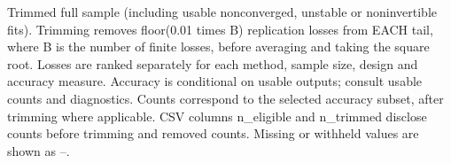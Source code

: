 \begin{table}[p]\centering
\caption{Usable forecast replications.}
\label{tab:sim-forecast-counts}
\small\setlength{\tabcolsep}{4pt}\renewcommand{\arraystretch}{1.15}
\par\medskip
\begin{minipage}{\linewidth}\footnotesize Trimmed full sample (including usable nonconverged, unstable or noninvertible fits). Trimming removes floor(0.01 times B) replication losses from EACH tail, where B is the number of finite losses, before averaging and taking the square root. Losses are ranked separately for each method, sample size, design and accuracy measure. Accuracy is conditional on usable outputs; consult usable counts and diagnostics. Counts correspond to the selected accuracy subset, after trimming where applicable. CSV columns n\_eligible and n\_trimmed disclose counts before trimming and removed counts.  Missing or withheld values are shown as --.\end{minipage}
\end{table}
